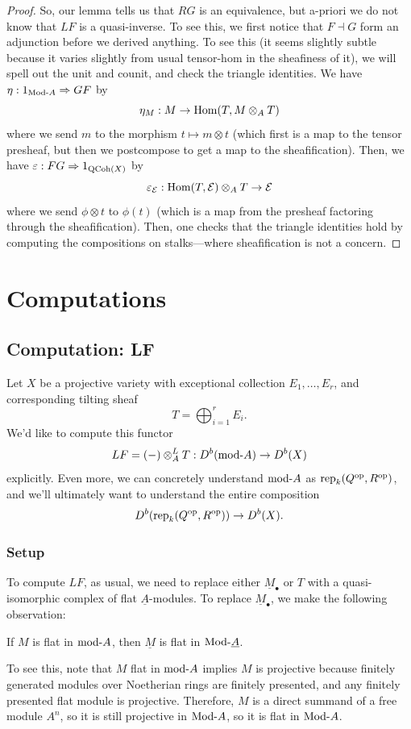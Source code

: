 \documentclass[12pt]{article}
\begin{document}
\begin{proof}
    So, our lemma tells us that $RG$ is an equivalence, but a-priori we do not know that $LF$ is a quasi-inverse. To see this, we first notice that $F\dashv G$ form an adjunction before we derived anything. To see this (it seems slightly subtle because it varies slightly from usual tensor-hom in the sheafiness of it), we will spell out the unit and counit, and check the triangle identities. We have $\eta: 1_{\mathrm{Mod}\text{-} A} \Rightarrow GF$ by
    \[\eta_M: M \to \mathrm{Hom}(T,M\otimes_A T)\]
    where we send $m$ to the morphism $t\mapsto m\otimes t$ (which first is a map to the tensor presheaf, but then we postcompose to get a map to the sheafification). Then, we have $\varepsilon: FG \Rightarrow 1_{\mathrm{QCoh}(X)}$ by
    \[\varepsilon_{\mathcal{E}}: \mathrm{Hom}(T,\mathcal{E}) \otimes_A T \to \mathcal{E}\]
    where we send $\phi \otimes t$ to $\phi(t)$ (which is a map from the presheaf factoring through the sheafification). Then, one checks that the triangle identities hold by computing the compositions on stalks---where sheafification is not a concern.
\end{proof}


\section{Computations}

\subsection{Computation: LF}

Let $X$ be a projective variety with exceptional collection $E_1,\dots,E_r$, and corresponding tilting sheaf
\[T = \bigoplus_{i=1}^r E_i.\]
We'd like to compute this functor
\[LF = (-) \otimes_A^L T: D^b(\mathrm{mod}\text{-} A) \to D^b(X)\]
explicitly. Even more, we can concretely understand $\mathrm{mod}\text{-} A$ as $\mathrm{rep}_k(Q^{\mathrm{op}},R^{\mathrm{op}})$, and we'll ultimately want to understand the entire composition
\[D^b(\mathrm{rep}_k(Q^{\mathrm{op}},R^{\mathrm{op}})) \to D^b(X).\]

\subsubsection{Setup}
To compute $LF$, as usual, we need to replace either $\underline{M}_\bullet$ or $T$ with a quasi-isomorphic complex of flat $\underline{A}$-modules. To replace $\underline{M}_\bullet$, we make the following observation:

If $M$ is flat in $\mathrm{mod}\text{-} A$, then $\underline{M}$ is flat in $\mathrm{Mod}\text{-} \underline{A}$.

To see this, note that $M$ flat in $\mathrm{mod}\text{-} A$ implies $M$ is projective because finitely generated modules over Noetherian rings are finitely presented, and any finitely presented flat module is projective. Therefore, $M$ is a direct summand of a free module $A^n$, so it is still projective in $\mathrm{Mod}\text{-} A$, so it is flat in $\mathrm{Mod}\text{-} A$.
\end{document}

